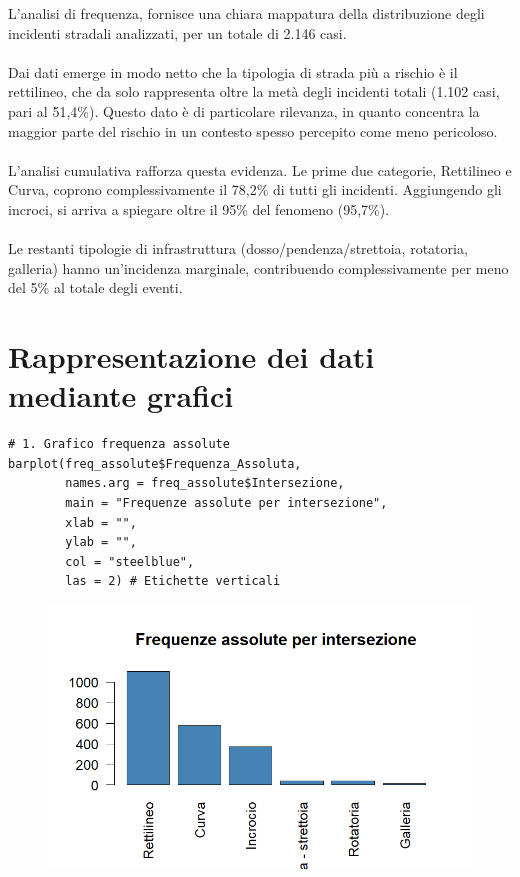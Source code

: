 \documentclass[14pt, openany, titlepage]{report} %
\begin{document}
\noindent
L'analisi di frequenza, fornisce una chiara mappatura della 
distribuzione degli incidenti stradali analizzati, per un totale 
di 2.146 casi. \\\\
\noindent
Dai dati emerge in modo netto che la tipologia di strada più a 
rischio è il rettilineo, che da solo rappresenta oltre la metà 
degli incidenti totali (1.102 casi, pari al 51,4\%). 
Questo dato è di particolare rilevanza, in quanto concentra la 
maggior parte del rischio in un contesto spesso percepito come meno 
pericoloso.\\\\
\noindent
L'analisi cumulativa rafforza questa evidenza. Le prime due categorie,
 Rettilineo e Curva, coprono complessivamente il 78,2\% di tutti gli 
 incidenti. Aggiungendo gli incroci, si arriva a spiegare oltre il 95\% 
 del fenomeno (95,7\%).\\\\
\noindent
Le restanti tipologie di infrastruttura (dosso/pendenza/strettoia,
 rotatoria, galleria) hanno un'incidenza marginale, contribuendo 
 complessivamente per meno del 5\% al totale degli eventi.

\chapter{Rappresentazione dei dati mediante grafici}
\begin{center}
\begin{lstlisting}[breaklines=true]
# 1. Grafico frequenza assolute
barplot(freq_assolute$Frequenza_Assoluta, 
        names.arg = freq_assolute$Intersezione,
        main = "Frequenze assolute per intersezione",
        xlab = "",
        ylab = "",
        col = "steelblue",
        las = 2) # Etichette verticali
\end{lstlisting}  
\end{center}

\begin{figure}[H] %
    \centering
    \includegraphics[width=12cm, height=7cm]{Rplot.png} %
\end{figure}
\end{document}
